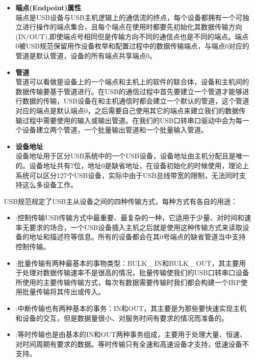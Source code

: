 \begin{enumerate}
\begin{itemize}
	\item \textbf{端点(Endpoint)属性}\\
	端点是USB设备与USB主机逻辑上的通信流的终点，每个设备都拥有一个可独立进行操作的端点集合，且每个端点在使用时都要先初始化其数据传输方向(IN/OUT),即使端点号相同但是传输方向不同的通信点也是不同的端点。端点0被USB规范保留用作设备枚举和配置过程中的数据传输端点，与端点0对应的管道是默认管道，设备的所有端点共享端点0\cite{李雪红2004USB}。
	
	\item \textbf{管道}\\
	管道可以看做是设备上的一个端点和主机上的软件的联合体，设备和主机间的数据传输要基于管道进行。在USB的通信过程中首先要建立一个管道才能够进行数据的传输，USB设备在和主机通信时都会建立一个默认的管道，这个管道对应的端点是默认端点0，之后需要自己使用其它的端点来建立我们的数据传输过程中需要使用的输入或输出管道。在我们的USB口转串口驱动中会为每一个设备建立两个管道，一个批量输出管道和一个批量输入管道。
	
	\item \textbf{设备地址}\\
	设备地址用于区分USB系统中的一个USB设备，设备地址由主机分配且是唯一的。设备地址共有7位，地址0是缺省地址，在设备初始化的时候使用，理论上系统可以区分127个USB设备，实际中由于USB总线带宽的限制，无法同时支持这么多设备工作\cite{李雪红2004USB}。
	\end{itemize}	
	
\end{enumerate}



\noindent USB规范规定了USB主从设备之间的四种传输方式，每种方式有各自的用途\cite{USB总线接口开发指南}：
\begin{itemize}
\item {}:控制传输USB传输方式中最重要、最复杂的一种，它适用于少量、对时间和速率无要求的场合，一个USB设备插入主机之后就是使用这种传输方式来读取设备的地址和描述符等信息。所有的设备都会在其0号端点的缺省管道当中支持控制传输\cite{张杰2008基于}。
\item {}:批量传输有两种最基本的事物类型：BULK\_ IN和BULK\_ OUT，其主要用于处理对数据传输速率不是很高的情况，批量传输使我们的USB口转串口设备所使用的主要传输传输方式，每次有数据需要传输时我们都会构建一个IRP使用批量传输将其传出或传入。
\item {}:中断传输也有两种基本的事务：IN和OUT，其主要是为那些要快速实现主机和设备的交互，但是数据量很小、对服务时间有要求的情况而准备的。
\item {}:等时传输也是由基本的IN和OUT两种事务组成，主要用于处理大量、恒速、对时间周期有要求的数据。等时传输只有全速和高速设备才支持，低速设备不支持\cite{张杰2008基于}。
\end{itemize}


